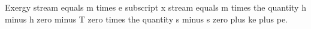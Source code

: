 Exergy stream equals m times e subscript x stream equals m times the quantity h minus h zero minus T zero times the quantity s minus s zero plus ke plus pe.